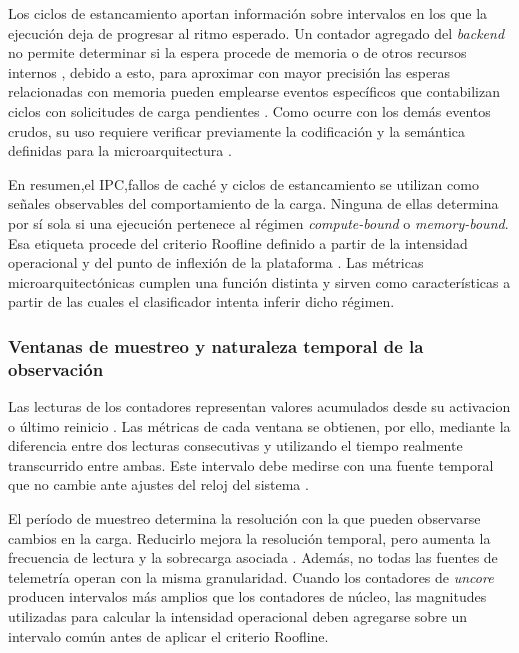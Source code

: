 Los ciclos de estancamiento aportan información sobre intervalos en los que la
ejecución deja de progresar al ritmo esperado. Un contador agregado del
\textit{backend} no permite determinar si la espera procede de memoria o de
otros recursos internos \cite{VTune2026}, debido a esto, para aproximar con mayor precisión
las esperas relacionadas con memoria pueden emplearse eventos específicos que
contabilizan ciclos con solicitudes de carga pendientes
\cite{IntelPerfmon2026}. Como ocurre con los demás eventos crudos, su uso
requiere verificar previamente la codificación y la semántica definidas para
la microarquitectura \cite{Weaver2008,IntelSDM2026}.

En resumen,el IPC,fallos de caché y ciclos de estancamiento se utilizan como señales
observables del comportamiento de la carga. Ninguna de ellas determina por sí
sola si una ejecución pertenece al régimen \textit{compute-bound} o
\textit{memory-bound}. Esa etiqueta procede del criterio Roofline definido a
partir de la intensidad operacional y del punto de inflexión de la plataforma
\cite{Williams2009}. Las métricas microarquitectónicas cumplen una función
distinta y sirven como características a partir de las cuales el clasificador
intenta inferir dicho régimen.

\subsubsection{Ventanas de muestreo y naturaleza temporal de la observación}
\label{sec:ventanas}

Las lecturas de los contadores representan valores acumulados desde su
activacion o último reinicio \cite{LinuxPerfEventOpen2026}. Las métricas de
cada ventana se obtienen, por ello, mediante la diferencia entre dos lecturas
consecutivas y utilizando el tiempo realmente transcurrido entre ambas. Este
intervalo debe medirse con una fuente temporal que no cambie ante ajustes del
reloj del sistema \cite{LinuxClockGettime2026}.

El período de muestreo determina la resolución con la que pueden observarse
cambios en la carga. Reducirlo mejora la resolución temporal, pero aumenta la
frecuencia de lectura y la sobrecarga asociada
\cite{LinuxPerfStat2026}. Además, no todas las fuentes de telemetría operan con
la misma granularidad. Cuando los contadores de \textit{uncore} producen
intervalos más amplios que los contadores de núcleo, las magnitudes utilizadas
para calcular la intensidad operacional deben agregarse sobre un intervalo
común antes de aplicar el criterio Roofline.

